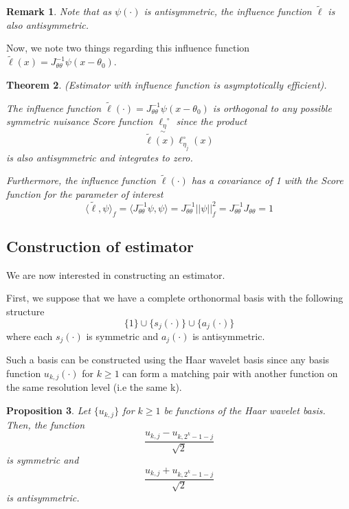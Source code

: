 \documentclass[twoside]{article}
\newcounter{lecnum}
\newtheorem{theorem}{Theorem}[lecnum]
\newtheorem{proposition}[theorem]{Proposition}
\newtheorem{remark}[theorem]{Remark}
\newcommand{\utilde}{\underset{\sim}}
\begin{document}
\begin{remark} Note that as $\psi(\cdot)$ is antisymmetric, the influence function $\tilde{\ell}$ is also antisymmetric.
\end{remark}

Now, we note two things regarding this influence function $\tilde{\ell}(x) = J_{\theta \theta}^{-1}\psi(x - \theta_0)$.

\begin{theorem}(Estimator with influence function is asymptotically efficient).

The influence function $\tilde{\ell}(\cdot) = J_{\theta \theta}^{-1}\psi(x - \theta_0)$ is orthogonal to any possible symmetric nuisance Score function $\utilde{\ell_{\eta}}^{\circ}$ since the product 
$$
\tilde{\ell}(x)\ell_{\eta_{j}}^{\circ}(x)
$$
is also antisymmetric and integrates to zero.

Furthermore, the influence function $\tilde{\ell}(\cdot)$ has a covariance of 1 with the Score function for the parameter of interest 
$$
\langle \tilde{\ell}, \psi \rangle_f = \langle J_{\theta \theta}^{-1}\psi, \psi \rangle = J_{\theta \theta}^{-1}||\psi ||_{f}^{2} = J_{\theta \theta}^{-1}J_{\theta \theta} = 1
$$
\end{theorem}

\subsection{Construction of estimator}
We are now interested in constructing an estimator.

First, we suppose that we have a complete orthonormal basis with the following structure 
$$
\{1\} \cup \{s_j(\cdot)\} \cup \{a_j(\cdot)\}
$$
where each $s_j(\cdot)$ is symmetric and $a_j(\cdot)$ is antisymmetric. 

Such a basis can be constructed using the Haar wavelet basis since any basis function $u_{k,j}(\cdot)$ for $k \geq 1$ can form a matching pair with another function on the same resolution level (i.e the same k). 

\begin{proposition} Let $\{u_{k,j}\}$ for $k \geq 1$ be functions of the Haar wavelet basis. Then, the function
\begin{equation}
\frac{u_{k,j} - u_{k,2^{k}-1-j}}{\sqrt{2}}
\end{equation}
is symmetric and 
\begin{equation}
\frac{u_{k,j} + u_{k,2^{k}-1-j}}{\sqrt{2}}
\end{equation}
is antisymmetric.
\end{proposition}
\end{document}
